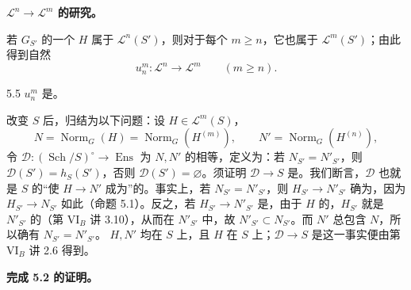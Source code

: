 \textbf{ $\mathscr L^n\to\mathscr L^m$ 的研究。}

若 $G_{S'}$ 的一个 $H$ 属于 $\mathscr L^n(S')$，则对于每个 $m\geq n$，它也属于 $\mathscr L^m(S')$；由此得到自然
\[u_n^m:\mathscr L^n\longrightarrow\mathscr L^m\qquad(m\geq n).\]
\begin{SGAresult}{}{5.5}
 $u_n^m$ 是。
\end{SGAresult}
改变 $S$ 后，归结为以下问题：设 $H\in\mathscr L^m(S)$，
\[N=\operatorname{Norm}_G(H)=\operatorname{Norm}_G(H^{(m)}),\qquad N'=\operatorname{Norm}_G(H^{(n)}),\]
令 $\mathscr D:(\operatorname{Sch}/S)^{\circ}\to\operatorname{Ens}$ 为 $N,N'$ 的相等，定义为：若 $N_{S'}=N'_{S'}$，则 $\mathscr D(S')=h_S(S')$，否则 $\mathscr D(S')=\varnothing$。须证明 $\mathscr D\to S$ 是。我们断言，$\mathscr D$ 也就是 $S$ 的“使 $H\to N'$ 成为”的。事实上，若 $N_{S'}=N'_{S'}$，则 $H_{S'}\to N'_{S'}$ 确为，因为 $H_{S'}\to N_{S'}$ 如此（命题 5.1）。反之，若 $H_{S'}\to N'_{S'}$ 是，由于 $H$ 的，$H_{S'}$ 就是 $N'_{S'}$ 的（第 VI$_B$ 讲 3.10），从而在 $N'_{S'}$ 中，故 $N'_{S'}\subset N_{S'}$。而 $N'$ 总包含 $N$，所以确有 $N_{S'}=N'_{S'}$。 $H,N'$ 均在 $S$ 上，且 $H$ 在 $S$ 上；$\mathscr D\to S$ 是这一事实便由第 VI$_B$ 讲 2.6 得到。

\textbf{完成 5.2 的证明。}

